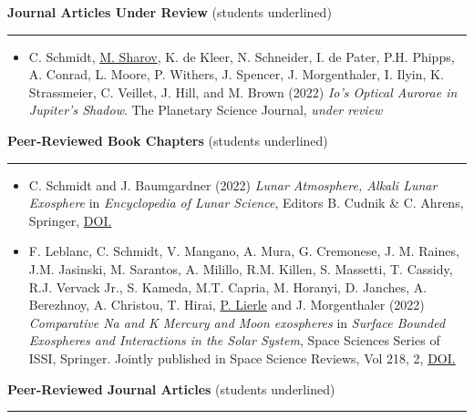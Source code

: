 \documentclass[12pt]{report}
\begin{document}
\vspace{2 mm}
\noindent\textbf{Journal Articles Under Review} (students underlined) \rm\hspace*{\fill} \\
\rule{\textwidth}{1pt}
\begin{itemize} \itemsep -2pt %
  \item C. Schmidt, \underline{M. Sharov}, K. de Kleer, N. Schneider, I. de Pater, P.H. Phipps, A. Conrad, L. Moore, P. Withers, J. Spencer, J. Morgenthaler, I. Ilyin, K. Strassmeier, C. Veillet, J. Hill, and M. Brown (2022) \textit{Io’s Optical Aurorae in Jupiter’s Shadow}. The Planetary Science Journal, \textit{under review}
 \end{itemize}
\vspace{2 mm}
\noindent\textbf{Peer-Reviewed Book Chapters} (students underlined) \rm\hspace*{\fill} \\
\rule{\textwidth}{1pt}
\begin{itemize} \itemsep -2pt %
  \item C. Schmidt and J. Baumgardner (2022) \textit{Lunar Atmosphere, Alkali Lunar Exosphere} in \textit{Encyclopedia of Lunar Science}, Editors B. Cudnik \& C. Ahrens, Springer, \href{https://doi.org/10.1007/978-3-319-05546-6_230-1}{DOI.}
  \item F. Leblanc, C. Schmidt, V. Mangano, A. Mura, G. Cremonese, J. M. Raines, J.M. Jasinski, M. Sarantos, A. Milillo, R.M. Killen, S. Massetti, T. Cassidy, R.J. Vervack Jr., S. Kameda, M.T. Capria, M. Horanyi, D. Janches, A. Berezhnoy, A. Christou, T. Hirai, \underline{P. Lierle} and J. Morgenthaler (2022) \textit{Comparative Na and K Mercury and Moon exospheres} in \textit{Surface Bounded Exospheres and Interactions in the Solar System}, Space Sciences Series of ISSI, Springer. Jointly published in Space Science Reviews, Vol 218, 2, \href{ https://doi.org/10.1007/s11214-022-00871-w}{DOI.}
 \end{itemize}
\vspace{2 mm}
\noindent\textbf{Peer-Reviewed Journal Articles} (students underlined) \rm\hspace*{\fill} \\
\rule{\textwidth}{1pt}
\end{document}
